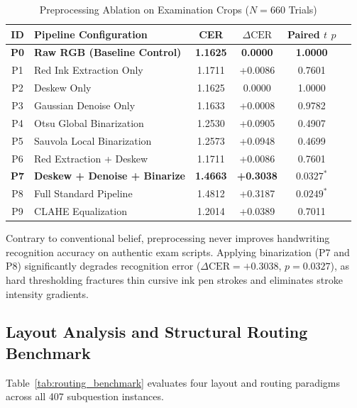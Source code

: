 \documentclass[journal]{IEEEtran}
\begin{document}
\begin{table}[htbp]
\centering
\caption{Preprocessing Ablation on Examination Crops ($N = 660$ Trials)}
\label{tab:preprocessing_ablation}
\begin{tabular}{clcccc}
\toprule
\textbf{ID} & \textbf{Pipeline Configuration} & \textbf{CER} & \textbf{$\Delta\text{CER}$} & \textbf{Paired $t$ $p$} \\
\midrule
\textbf{P0} & \textbf{Raw RGB (Baseline Control)} & \textbf{1.1625} & \textbf{0.0000} & \textbf{1.0000} \\
P1 & Red Ink Extraction Only & 1.1711 & +0.0086 & 0.7601 \\
P2 & Deskew Only & 1.1625 & 0.0000 & 1.0000 \\
P3 & Gaussian Denoise Only & 1.1633 & +0.0008 & 0.9782 \\
P4 & Otsu Global Binarization & 1.2530 & +0.0905 & 0.4907 \\
P5 & Sauvola Local Binarization & 1.2573 & +0.0948 & 0.4699 \\
P6 & Red Extraction + Deskew & 1.1711 & +0.0086 & 0.7601 \\
\textbf{P7} & \textbf{Deskew + Denoise + Binarize} & \textbf{1.4663} & \textbf{+0.3038} & $\mathbf{0.0327^*}$ \\
P8 & Full Standard Pipeline & 1.4812 & +0.3187 & $\mathbf{0.0249^*}$ \\
P9 & CLAHE Equalization & 1.2014 & +0.0389 & 0.7011 \\
\bottomrule
\end{tabular}
\end{table}

Contrary to conventional belief, preprocessing never improves handwriting recognition accuracy on authentic exam scripts. Applying binarization (P7 and P8) significantly degrades recognition error ($\Delta\text{CER} = +0.3038$, $p = 0.0327$), as hard thresholding fractures thin cursive ink pen strokes and eliminates stroke intensity gradients.

\subsection{Layout Analysis and Structural Routing Benchmark}
Table~\ref{tab:routing_benchmark} evaluates four layout and routing paradigms across all 407 subquestion instances.
\end{document}
